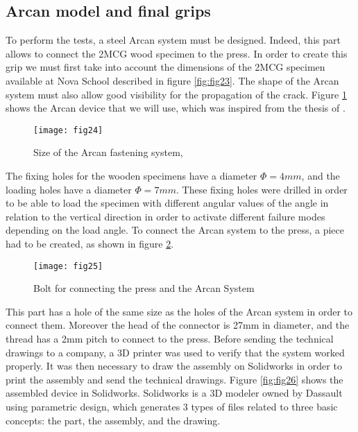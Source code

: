 \subsection{Arcan model and final grips}

To perform the tests, a steel Arcan system must be designed. Indeed, this part allows to connect the 2MCG wood specimen to the press. In order to create this grip we must first take into account the dimensions of the 2MCG specimen available at Nova School described in figure \ref{fig:fig23}. The shape of the Arcan system must also allow good visibility for the propagation of the crack. Figure \ref{fig:fig24} shows the Arcan device that we will use, which was inspired from the thesis of \cite{Odounga2018phd}.


\begin{figure}[htp]
	\centering
	\texttt{[image: fig24]}
	\caption{Size of the Arcan fastening system, \cite{Odounga2018phd}}
	\label{fig:fig24}
\end{figure}

The fixing holes for the wooden specimens have a diameter $\Phi= 4 mm$, and the loading holes have a diameter $\Phi = 7 mm$. These fixing holes were drilled in order to be able to load the specimen with different angular values of the angle in relation to the vertical direction in order to activate different failure modes depending on the load angle. To connect the Arcan system to the press, a piece had to be created, as shown in figure \ref{fig:fig25}.


\begin{figure}[htp]
	\centering
	\texttt{[image: fig25]}
	\caption{Bolt for connecting the press and the Arcan System}
	\label{fig:fig25}
\end{figure}

This part has a hole of the same size as the holes of the Arcan system in order to connect them. Moreover the head of the connector is 27mm in diameter, and the thread has a 2mm pitch to connect to the press. Before sending the technical drawings to a company, a 3D printer was used to verify that the system worked properly. It was then necessary to draw the assembly on Solidworks in order to print the assembly and send the technical drawings. Figure \ref{fig:fig26} shows the assembled device in Solidworks. Solidworks is a 3D modeler owned by Dassault using parametric design, which generates 3 types of files related to three basic concepts: the part, the assembly, and the drawing.


